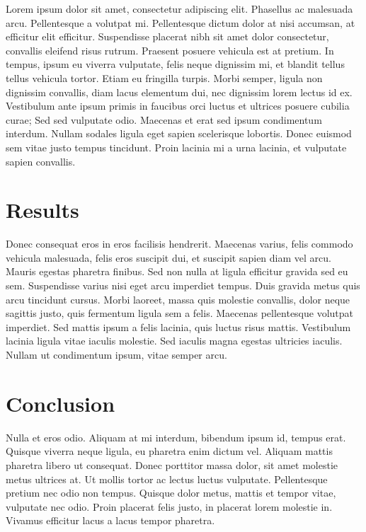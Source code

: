 \documentclass[a4paper, 11pt] {article}
\begin{document}
Lorem ipsum dolor sit amet, consectetur adipiscing elit. Phasellus ac malesuada arcu. Pellentesque a volutpat mi. Pellentesque dictum dolor at nisi accumsan, at efficitur elit efficitur. Suspendisse placerat nibh sit amet dolor consectetur, convallis eleifend risus rutrum. Praesent posuere vehicula est at pretium. In tempus, ipsum eu viverra vulputate, felis neque dignissim mi, et blandit tellus tellus vehicula tortor. Etiam eu fringilla turpis. Morbi semper, ligula non dignissim convallis, diam lacus elementum dui, nec dignissim lorem lectus id ex. Vestibulum ante ipsum primis in faucibus orci luctus et ultrices posuere cubilia curae; Sed sed vulputate odio. Maecenas et erat sed ipsum condimentum interdum. Nullam sodales ligula eget sapien scelerisque lobortis. Donec euismod sem vitae justo tempus tincidunt. Proin lacinia mi a urna lacinia, et vulputate sapien convallis. 



\section{Results}


Donec consequat eros in eros facilisis hendrerit. Maecenas varius, felis commodo vehicula malesuada, felis eros suscipit dui, et suscipit sapien diam vel arcu. Mauris egestas pharetra finibus. Sed non nulla at ligula efficitur gravida sed eu sem. Suspendisse varius nisi eget arcu imperdiet tempus. Duis gravida metus quis arcu tincidunt cursus. Morbi laoreet, massa quis molestie convallis, dolor neque sagittis justo, quis fermentum ligula sem a felis. Maecenas pellentesque volutpat imperdiet. Sed mattis ipsum a felis lacinia, quis luctus risus mattis. Vestibulum lacinia ligula vitae iaculis molestie. Sed iaculis magna egestas ultricies iaculis. Nullam ut condimentum ipsum, vitae semper arcu. 




\section{Conclusion}

 Nulla et eros odio. Aliquam at mi interdum, bibendum ipsum id, tempus erat. Quisque viverra neque ligula, eu pharetra enim dictum vel. Aliquam mattis pharetra libero ut consequat. Donec porttitor massa dolor, sit amet molestie metus ultrices at. Ut mollis tortor ac lectus luctus vulputate. Pellentesque pretium nec odio non tempus. Quisque dolor metus, mattis et tempor vitae, vulputate nec odio. Proin placerat felis justo, in placerat lorem molestie in. Vivamus efficitur lacus a lacus tempor pharetra.
\end{document}
